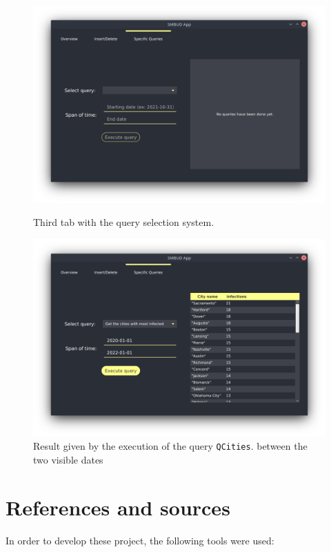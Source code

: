 \documentclass[12pt, a4paper]{article}
\begin{document}
\begin{figure}[h]
        \centering

        \includegraphics[width=.8\linewidth]{app_3.png}
        \caption*{Third tab with the query selection system.} %

        \includegraphics[width=.8\linewidth]{app_4.png}
        \caption*{Result given by the execution of the query 
            \texttt{QCities}. between the two visible dates} %
\end{figure}

\setlength\abovecaptionskip{0cm} %

\clearpage 

\section{References and sources}

In order to develop these project, the following tools were used:
\end{document}
